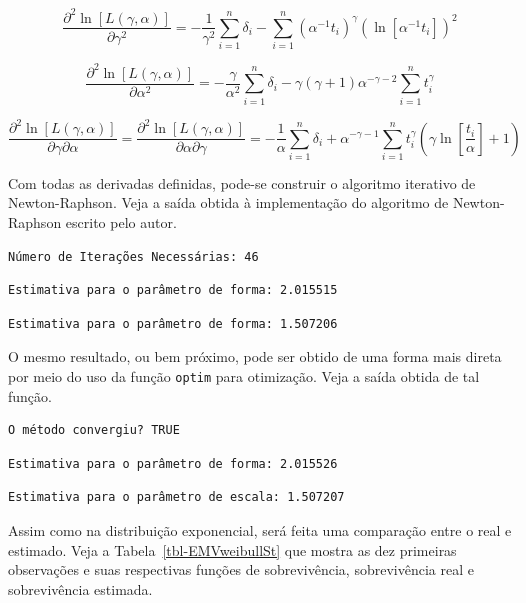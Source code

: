 \documentclass[
  12pt,
  letterpaper,
  DIV=11,
  numbers=noendperiod]{scrreprt}
\begin{document}
\[
\dfrac{\partial^{2} \ln[L (\gamma, \alpha)]}{\partial \gamma^{2}} =  - \dfrac{1}{\gamma^{2}} \sum_{i = 1}^{n} \delta_{i} - \sum_{i = 1}^{n} (\alpha^{-1} t_{i})^{\gamma} (\ln[\alpha^{-1} t_{i}])^{2}
\]

\[
\dfrac{\partial^{2} \ln [L(\gamma, \alpha)]}{\partial \alpha^{2}} = - \dfrac{\gamma}{\alpha^{2}} \sum_{i = 1}^{n} \delta_{i} - \gamma (\gamma + 1) \alpha^{-\gamma - 2} \sum_{i = 1}^{n} t_{i}^{\gamma}
\]

\[
\dfrac{\partial^{2} \ln[L(\gamma, \alpha)]}{\partial \gamma \partial \alpha} = \dfrac{\partial^{2} \ln[L(\gamma, \alpha)]}{\partial \alpha \partial \gamma} = - \dfrac{1}{\alpha} \sum_{i = 1}^{n} \delta_{i} + \alpha^{- \gamma - 1} \sum_{i = 1}^{n} t_{i}^{\gamma} \left( \gamma \ln\left[ \dfrac{t_{i}}{\alpha} \right] + 1 \right)
\]

Com todas as derivadas definidas, pode-se construir o algoritmo
iterativo de Newton-Raphson. Veja a saída obtida à implementação do
algoritmo de Newton-Raphson escrito pelo autor.

\begin{verbatim}
Número de Iterações Necessárias: 46 
\end{verbatim}

\begin{verbatim}
Estimativa para o parâmetro de forma: 2.015515 
\end{verbatim}

\begin{verbatim}
Estimativa para o parâmetro de forma: 1.507206 
\end{verbatim}

O mesmo resultado, ou bem próximo, pode ser obtido de uma forma mais
direta por meio do uso da função \texttt{optim} para otimização. Veja a
saída obtida de tal função.

\begin{verbatim}
O método convergiu? TRUE 
\end{verbatim}

\begin{verbatim}
Estimativa para o parâmetro de forma: 2.015526 
\end{verbatim}

\begin{verbatim}
Estimativa para o parâmetro de escala: 1.507207 
\end{verbatim}

Assim como na distribuição exponencial, será feita uma comparação entre
o real e estimado. Veja a Tabela~\ref{tbl-EMVweibullSt} que mostra as
dez primeiras observações e suas respectivas funções de sobrevivência,
sobrevivência real e sobrevivência estimada.
\end{document}
